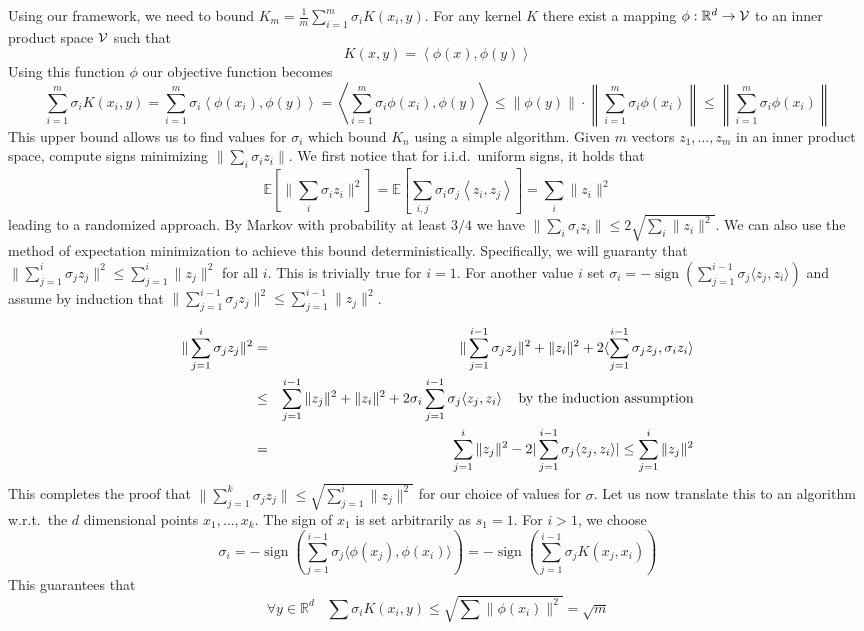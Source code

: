 \documentclass[anon,12pt]{colt2019} %
\newcommand{\ip}[1]{\left \langle #1 \right \rangle}
\newcommand{\R}{\mathbb{R}}
\newcommand{\E}{\mathbb{E}}
\begin{document}
Using our framework, we need to bound $K_m = \frac{1}{m}\sum_{i=1}^m \sigma_i K(x_i,y)$. For any kernel $K$ there exist a mapping $\phi: \R^d \to {\cal V}$ to an inner product space $\cal V$ such that 
$$ K(x,y) = \ip{\phi(x), \phi(y)} $$
Using this function $\phi$ our objective function becomes
$$\sum_{i=1}^m \sigma_i K(x_i,y) = \sum_{i=1}^m \sigma_i \ip{\phi(x_i), \phi(y)} =  \ip{ \sum_{i=1}^m \sigma_i \phi(x_i), \phi(y)} \leq \|\phi(y)\| \cdot \left\|  \sum_{i=1}^m \sigma_i \phi(x_i) \right\| \leq  \left\|  \sum_{i=1}^m \sigma_i \phi(x_i) \right\| $$
This upper bound allows us to find values for $\sigma_i$ which bound $K_n$ using a simple algorithm.
Given $m$ vectors $z_1,\ldots,z_m$ in an inner product space, compute signs minimizing $\| \sum_i \sigma_i z_i \|$.
We first notice that for i.i.d.\ uniform signs, it holds that
$$\E[\| \sum_i \sigma_i z_i \|^2] = \E[\sum_{i,j} \sigma_i \sigma_j \ip{z_i, z_j}] = \sum_i \|z_i\|^2 $$
leading to a randomized approach. By Markov with probability at least $3/4$ we have $\| \sum_i \sigma_i z_i \| \le 2\sqrt{\sum_i \|z_i\|^2}$.
%
We can also use the method of expectation minimization to achieve this bound deterministically.
Specifically, we will guaranty that $\| \sum_{j=1}^i \sigma_j z_j \|^2 \le \sum_{j=1}^i \|z_j\|^2$ for all $i$.
This is trivially true for $i=1$. 
For another value $i$ set $\sigma_i = -\operatorname{sign} (\sum_{j=1}^{i-1}\sigma_j \langle z_j, z_i \rangle)$ 
and  assume by induction that $\| \sum_{j=1}^{i-1} \sigma_j z_j\|^2 \le \sum_{j=1}^{i-1} \|z_j\|^2$.

\begin{eqnarray*}
\| \sum_{j=1}^{i}\sigma_j z_j\|^2 &=& \|\sum_{j=1}^{i-1}\sigma_j z_j\|^2 + \|z_i\|^2 + 2\langle \sum_{j=1}^{i-1}\sigma_j z_j, \sigma_i z_i\rangle \\
&\le& \sum_{j=1}^{i-1} \|z_j\|^2 + \|z_i\|^2 + 2\sigma_i \sum_{j=1}^{i-1}\sigma_j \langle  z_j,  z_i\rangle \mbox{\;\;\; by the induction assumption}\\ 
&=& \sum_{j=1}^{i} \|z_j\|^2 - 2|\sum_{j=1}^{i-1}\sigma_j \langle  z_j,  z_i\rangle| \le \sum_{j=1}^{i} \|z_j\|^2
\end{eqnarray*}
This completes the proof that $\| \sum_{j=1}^{k}\sigma_j z_j\| \le \sqrt{\sum_{j=1}^{i} \|z_j\|^2}$ for our choice of values for $\sigma$. 
%
Let us now translate this to an algorithm w.r.t.\ the $d$ dimensional points $x_1,\ldots, x_k$. 
The sign of $x_1$ is set arbitrarily as $s_1=1$. For $i>1$, we choose 
$$ \sigma_i = -\operatorname{sign} (\sum_{j=1}^{i-1}\sigma_j \langle \phi(x_j), \phi(x_i) \rangle) = -\operatorname{sign} (\sum_{j=1}^{i-1}\sigma_j  K(x_j, x_i))$$
This guarantees that 
$$ \forall y \in \R^d \;\;\; \sum \sigma_i K(x_i, y) \leq \sqrt{ \sum \|\phi(x_i)\|^2 } = \sqrt{m} $$
\end{document}

